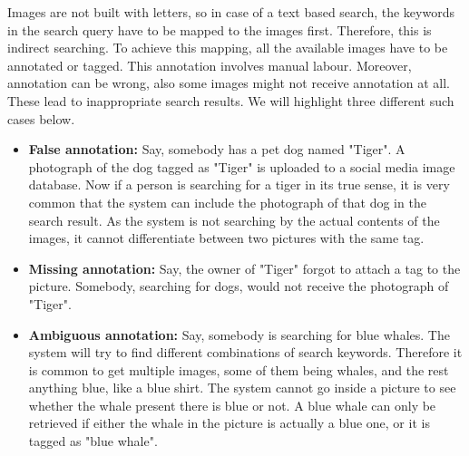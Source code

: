 \documentclass[english]{tktltiki}
\begin{document}
Images are not built with letters, so in case of a text based search, the keywords in the search query have to be mapped to the images first. Therefore, this is indirect searching. To achieve this mapping, all the available images have to be annotated or tagged. This annotation involves manual labour. Moreover, annotation can be wrong, also some images might not receive annotation at all. These lead to inappropriate search results. We will highlight three different such cases below.

\begin{itemize}
	\item \textbf{False annotation: }Say, somebody has a pet dog named "Tiger". A photograph of the dog tagged as "Tiger" is uploaded to a social media image database. Now if a person is searching for a tiger in its true sense, it is very common that the system can include the photograph of that dog in the search result. As the system is not searching by the actual contents of the images, it cannot differentiate between two pictures with the same tag.
	\item \textbf{Missing annotation: }Say, the owner of "Tiger" forgot to attach a tag to the picture. Somebody, searching for dogs, would not receive the photograph of "Tiger".
	\item \textbf{Ambiguous annotation: }Say, somebody is searching for blue whales. The system will try to find different combinations of search keywords. Therefore it is common to get multiple images, some of them being whales, and the rest anything blue, like a blue shirt. The system cannot go inside a picture to see whether the whale present there is blue or not. A blue whale can only be retrieved if either the whale in the picture is actually a blue one, or it is tagged as "blue whale".
\end{itemize}
\end{document}
